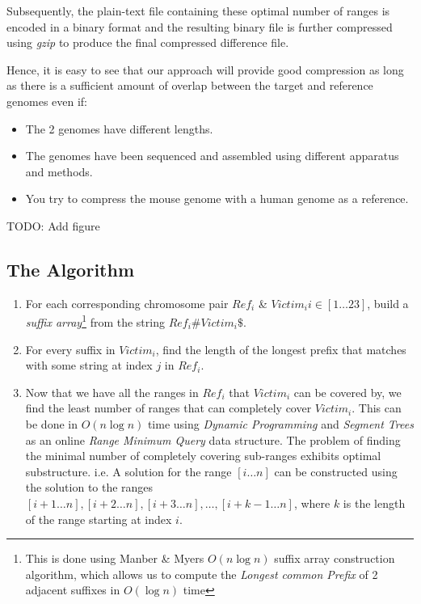 \documentclass[11pt]{article}
\begin{document}
Subsequently, the plain-text file containing these optimal number of
ranges is encoded in a binary format and the resulting binary file is
further compressed using \textit{gzip} to produce the final compressed
difference file.

Hence, it is easy to see that our approach will provide good
compression as long as there is a sufficient amount of overlap between
the target and reference genomes even if:
\begin{itemize}
\item The 2 genomes have different lengths.
\item The genomes have been sequenced and assembled using different
  apparatus and methods.
\item You try to compress the mouse genome with a human genome as a
  reference.
\end{itemize}

TODO: Add figure

\subsection{The Algorithm}

\begin{enumerate}

\item For each corresponding chromosome pair ${Ref}_i$ \& $Victim_i i
  \in [1\ldots{}23]$, build a
  \textit{suffix array}\footnote{This is done using Manber \& Myers
    $O(n\log{n})$ suffix array construction
    algorithm\cite{manbermyers}, which allows us to compute the
    \textit{Longest common Prefix} of 2 adjacent suffixes in
    $O(\log{n})$ time} from the string $Ref_i\#Victim_i\$$.

\item For every suffix in ${Victim}_i$, find the length of the longest
  prefix that matches with some string at index $j$ in ${Ref}_i$.

\item Now that we have all the ranges in $Ref_i$ that $Victim_i$ can
  be covered by, we find the least number of ranges that can
  completely cover $Victim_i$. This can be done in $O(n\log{n})$ time
  using \textit{Dynamic Programming} and \textit{Segment Trees} as an
  online \textit{Range Minimum Query} data structure. The problem of
  finding the minimal number of completely covering sub-ranges
  exhibits optimal substructure. i.e. A solution for the range
  $[i\ldots{}n]$ can be constructed using the solution to the ranges
  $[i+1\ldots{}n], [i+2\ldots{}n], [i+3\ldots{}n], \ldots{},
  [i+k-1\ldots{}n]$, where $k$ is the length of the range starting at
  index $i$.

\end{enumerate}
\end{document}
